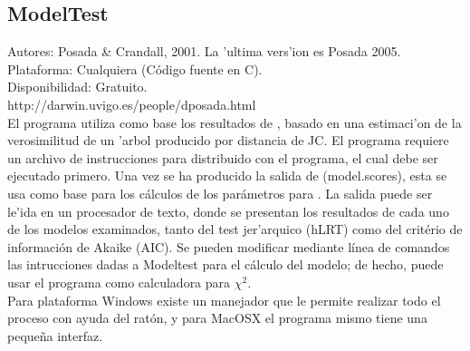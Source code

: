 \subsection{ModelTest}
\noindent
Autores: Posada \& Crandall, 2001. La 'ultima vers'ion es Posada 2005.
\\Plataforma: Cualquiera (C\'odigo fuente en C).\\
Disponibilidad: Gratuito.\\
http://darwin.uvigo.es/people/dposada.html
\\
El programa utiliza como base los resultados de , basado en una estimaci'on de la verosimilitud de un 'arbol producido por distancia de JC. El programa requiere un archivo de instrucciones para  distribuido con el programa, el cual debe ser ejecutado primero. Una vez se ha producido la salida de  (model.scores), esta se usa como base para los c\'alculos de los par\'ametros para . La salida puede ser le'ida en un procesador de texto, donde se presentan los resultados de cada uno de los modelos examinados, tanto del test jer'arquico (hLRT) como del crit\'erio de informaci\'on de Akaike (AIC). Se pueden modificar mediante l\'inea de comandos las intrucciones dadas a Modeltest para el c\'alculo del modelo; de hecho, puede usar el programa como calculadora para $\chi ^2$.\\
Para plataforma Windows existe un manejador que le permite realizar todo el proceso con ayuda del rat\'on, y para MacOSX el programa mismo tiene una peque\~na interfaz.

